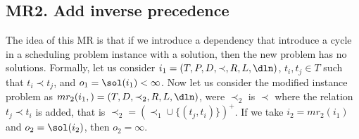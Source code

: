 




















\subsection{MR2. Add inverse precedence}
The idea of this MR is that if we introduce a dependency that
introduce a cycle in a scheduling problem instance with a solution,
then the new problem has no solutions. Formally,
let us consider $i_{1}=(T, P, D, \prec, R, L, \dln)$,
$t_{i}, t_{j}\in T$ such that $t_{i}\prec t_{j}$, and
$o_{1}=\sol(i_{1})<\infty$.
Now let us consider
the modified instance problem as $mr_{2}(i_{1},)=(T, D, \prec_{2}, R, L,
\dln)$,
were $\prec_{2}$ is $\prec$ where the relation $t_{j}\prec t_{i}$ is
added, that is $\prec_{2}= (\prec_{1}\cup \{(t_{j}, t_{i})\})^{+}$.
If we take $i_{2}=mr_{2}(i_{1})$ and $o_{2}=\sol(i_{2})$, then
$o_{2}=\infty$.

